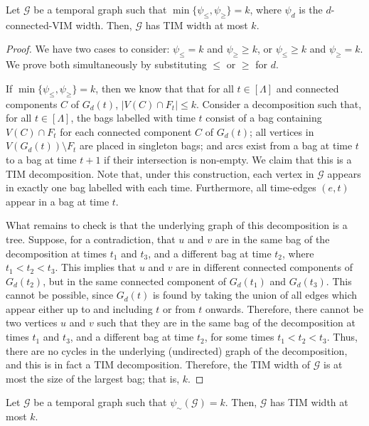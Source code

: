 \documentclass[a4paper,UKenglish,cleveref, autoref, thm-restate]{lipics-v2021} %
\begin{document}
\begin{lemmarep}
\label{lem:tim-bounds-cimw}
    Let $\mathcal{G}$ be a temporal graph such that $\min\{\psi_{\leq}, \psi_{\geq}\}=k$, where $\psi_d$ is the $d$-connected-VIM width. Then, $\mathcal{G}$ has TIM width at most $k$.
\end{lemmarep}
\begin{proof}
    We have two cases to consider: $\psi_{\leq}= k$ and $\psi_{\geq}\geq k$, or $\psi_{\leq}\geq k$ and $\psi_{\geq}= k$. We prove both simultaneously by substituting $\leq$ or $\geq$ for $d$.
    
    If $\min\{\psi_{\leq}, \psi_{\geq}\}=k$, then we know that that for all $t\in[\Lambda]$ and connected components $C$ of $G_{d}(t)$, $|V(C)\cap F_t|\leq k$. Consider a decomposition such that, for all $t\in [\Lambda]$, the bags labelled with time $t$ consist of a bag containing $V(C)\cap F_t$ for each connected component $C$ of $G_{d}(t)$; all vertices in $V(G_{d}(t))\setminus F_t$ are placed in singleton bags; and arcs exist from a bag at time $t$ to a bag at time $t+1$ if their intersection is non-empty. We claim that this is a TIM decomposition. Note that, under this construction, each vertex in $\mathcal{G}$ appears in exactly one bag labelled with each time. Furthermore, all time-edges $(e,t)$ appear in a bag at time $t$. 
    
    What remains to check is that the underlying graph of this decomposition is a tree. Suppose, for a contradiction, that $u$ and $v$ are in the same bag of the decomposition at times $t_1$ and $t_3$, and a different bag at time $t_2$, where $t_1<t_2<t_3$. This implies that $u$ and $v$ are in different connected components of $G_d(t_2)$, but in the same connected component of $G_d(t_1)$ and $G_d(t_3)$. This cannot be possible, since $G_d(t)$ is found by taking the union of all edges which appear either up to and including $t$ or from $t$ onwards. Therefore, there cannot be two vertices $u$ and $v$ such that they are in the same bag of the decomposition at times $t_1$ and $t_3$, and a different bag at time $t_2$, for some times $t_1<t_2<t_3$. Thus, there are no cycles in the underlying (undirected) graph of the decomposition, and this is in fact a TIM decomposition. Therefore, the TIM width of $\mathcal{G}$ is at most the size of the largest bag; that is, $k$.
\end{proof}
\begin{lemmarep}\label{lem:tim-bounds-bi-cimw}
    Let $\mathcal{G}$ be a temporal graph such that $\psi_{\sim}(\mathcal{G})=k$. Then, $\mathcal{G}$ has TIM width at most $k$.
\end{lemmarep}
\end{document}
